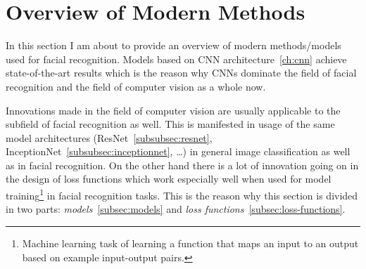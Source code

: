 \section{Overview of Modern Methods}\label{sec:mod-methods}
In this section I am about to provide an overview of modern methods/models used for facial recognition.
Models based on CNN architecture~\ref{ch:cnn} achieve state-of-the-art results which is the reason why CNNs dominate the
field of facial recognition and the field of computer vision as a whole now.

Innovations made in the field of computer vision are usually applicable to the subfield of facial recognition as well.
This is manifested in usage of the same model architectures (ResNet~\ref{subsubsec:resnet},
InceptionNet~\ref{subsubsec:inceptionnet}, \ldots) in general image classification as well as in facial recognition.
On the other hand there is a lot of innovation going on in the design of loss functions which work especially well
when used for model training\footnote{Machine learning task of learning a function that maps an input to an output
based on example input-output pairs.} in facial recognition tasks.
This is the reason why this section is divided in two parts: \textit{models}~\ref{subsec:models} and
\textit{loss functions}~\ref{subsec:loss-functions}.


